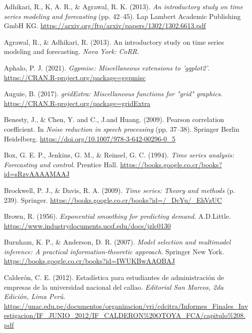 \documentclass[
]{article}
\newlength{\cslhangindent}
\newlength{\cslentryspacingunit} %
\newenvironment{CSLReferences}[2] %
 {%
  \setlength{\parindent}{0pt}
  \ifodd #1
  \let\oldpar\par
  \def\par{\hangindent=\cslhangindent\oldpar}
  \fi
  \setlength{\parskip}{#2\cslentryspacingunit}
 }%
 {}
\begin{document}
\hypertarget{refs}{}
\begin{CSLReferences}{1}{0}
\leavevmode{}%
Adhikari, R., K, A. R., \& Agrawal, R. K. (2013). \emph{An introductory
study on time series modeling and forecasting} (pp. 42--45). Lap Lambert
Academic Publishing GmbH KG.
\url{https://arxiv.org/ftp/arxiv/papers/1302/1302.6613.pdf}

\leavevmode{}%
Agrawal, R., \& Adhikari, R. (2013). An introductory study on time
series modeling and forecasting. \emph{Nova York: CoRR}.

\leavevmode{}%
Aphalo, P. J. (2021). \emph{Ggpmisc: Miscellaneous extensions to
'ggplot2'}. \url{https://CRAN.R-project.org/package=ggpmisc}

\leavevmode{}%
Auguie, B. (2017). \emph{gridExtra: Miscellaneous functions for "grid"
graphics}. \url{https://CRAN.R-project.org/package=gridExtra}

\leavevmode{}%
Benesty, J., \& Chen, Y. and C., J.and Huang. (2009). Pearson
correlation coefficient. In \emph{Noise reduction in speech processing}
(pp. 37--38). Springer Berlin Heidelberg.
\url{https://doi.org/10.1007/978-3-642-00296-0_5}

\leavevmode{}%
Box, G. E. P., Jenkins, G. M., \& Reinsel, G. C. (1994). \emph{Time
series analysis: Forecasting and control}. Prentice Hall.
\url{https://books.google.co.cr/books?id=sRzvAAAAMAAJ}

\leavevmode{}%
Brockwell, P. J., \& Davis, R. A. (2009). \emph{Time series: Theory and
methods} (p. 239). Springer.
\url{https://books.google.co.cr/books?id=/_DcYu/_EhVzUC}

\leavevmode{}%
Brown, R. (1956). \emph{Exponential smoothing for predicting demand}.
A.D.Little. \url{https://www.industrydocuments.ucsf.edu/docs/jzlc0130}

\leavevmode{}%
Burnham, K. P., \& Anderson, D. R. (2007). \emph{Model selection and
multimodel inference: A practical information-theoretic approach}.
Springer New York.
\url{https://books.google.co.cr/books?id=IWUKBwAAQBAJ}

\leavevmode{}%
Calderón, C. E. (2012). Estadística para estudiantes de administración
de empresas de la universidad nacional del callao. \emph{Editorial San
Marcos, 2da Edición, Lima Perú}.
\url{https://unac.edu.pe/documentos/organizacion/vri/cdcitra/Informes_Finales_Investigacion/IF_JUNIO_2012/IF_CALDERON\%20OTOYA_FCA/capitulo\%208.pdf}


\end{CSLReferences}
\end{document}
